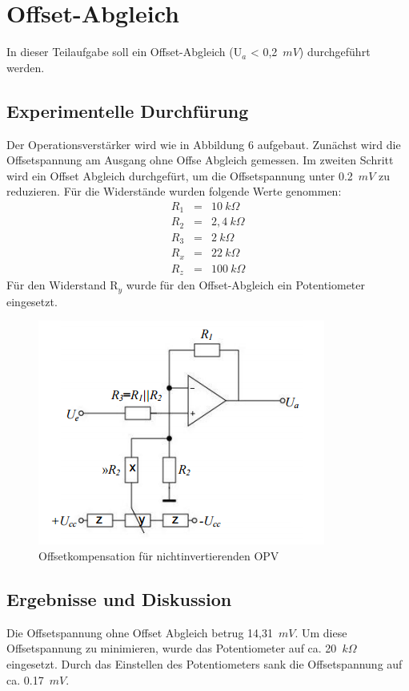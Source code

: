 \section{Offset-Abgleich}
In dieser Teilaufgabe soll ein Offset-Abgleich (U$_a$ < 0,2~$mV$) durchgef\"uhrt werden.
\subsection{Experimentelle Durchf\"urung}
Der Operationsverst\"arker wird wie in Abbildung 6 aufgebaut. Zun\"achst wird die Offsetspannung am Ausgang ohne Offse Abgleich gemessen. Im zweiten Schritt wird ein Offset Abgleich durchgef\"urt, um die Offsetspannung unter 0.2~$mV$ zu reduzieren. F\"ur die Widerst\"ande wurden folgende Werte genommen: 
\begin{eqnarray*}
R_1 &=& 10~k\Omega\\
R_2 &=& 2,4~k\Omega\\
R_3 &=& 2~k\Omega\\
R_x &=& 22~k\Omega\\
R_z &=& 100~k\Omega
\end{eqnarray*}
F\"ur den Widerstand R$_y$ wurde f\"ur den Offset-Abgleich ein Potentiometer eingesetzt. 
\begin{figure}[!ht]
\begin{center}
\includegraphics[scale=0.8]{bild/Schaltung}
\caption{Offsetkompensation f\"ur nichtinvertierenden OPV}
\end{center}
\end{figure}
\newpage
\subsection{Ergebnisse und Diskussion}
Die Offsetspannung ohne Offset Abgleich betrug 14,31~$mV$. Um diese Offsetspannung zu minimieren, wurde das Potentiometer auf ca. 20~$k\Omega$ eingesetzt. Durch das Einstellen des Potentiometers sank die Offsetspannung auf ca. 0.17~$mV$.


